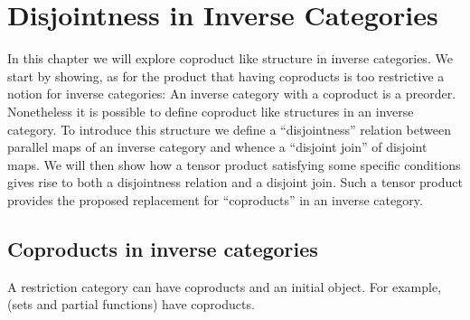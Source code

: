 \chapter{Disjointness in Inverse Categories} %
\label{cha:disjointness_in_inverse_categories}

In this chapter we will explore coproduct like structure in inverse categories. We start by showing,
as for the product that having coproducts is too restrictive a notion for inverse categories: An
inverse category with a coproduct is a preorder.
Nonetheless it is possible to define coproduct like structures in an inverse category. To introduce
this structure we define a ``disjointness'' relation between parallel maps of an inverse category
and whence a ``disjoint join'' of disjoint maps. We will then show how a tensor product satisfying
some specific conditions gives rise to both a disjointness relation and a disjoint join. Such a
tensor product provides the proposed replacement for ``coproducts'' in an inverse category.



\section{Coproducts in inverse categories} %
\label{sec:coproducts_in_inverse_categories}

A restriction category can have coproducts and an initial object. For example, \Par (sets and
partial functions) have coproducts.

